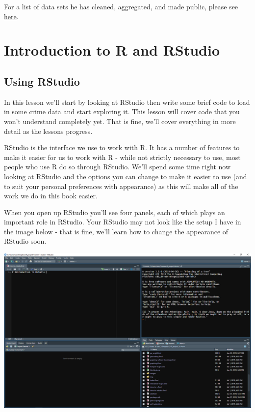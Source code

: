 \documentclass[
  12pt,
]{book}
\begin{document}
For a list of data sets he has cleaned, aggregated, and made public, please see \href{http://jacobdkaplan.com/data.html}{here}.

\hypertarget{introduction-to-r-and-rstudio}{%
\chapter{Introduction to R and RStudio}\label{introduction-to-r-and-rstudio}}

\hypertarget{using-rstudio}{%
\section{Using RStudio}\label{using-rstudio}}

In this lesson we'll start by looking at RStudio then write some brief code to load in some crime data and start exploring it. This lesson will cover code that you won't understand completely yet. That is fine, we'll cover everything in more detail as the lessons progress.

RStudio is the interface we use to work with R. It has a number of features to make it easier for us to work with R - while not strictly necessary to use, most people who use R do so through RStudio. We'll spend some time right now looking at RStudio and the options you can change to make it easier to use (and to suit your personal preferences with appearance) as this will make all of the work we do in this book easier.

When you open up RStudio you'll see four panels, each of which plays an important role in RStudio. Your RStudio may not look like the setup I have in the image below - that is fine, we'll learn how to change the appearance of RStudio soon.

\includegraphics{images/rstudio_1.PNG}
\end{document}
